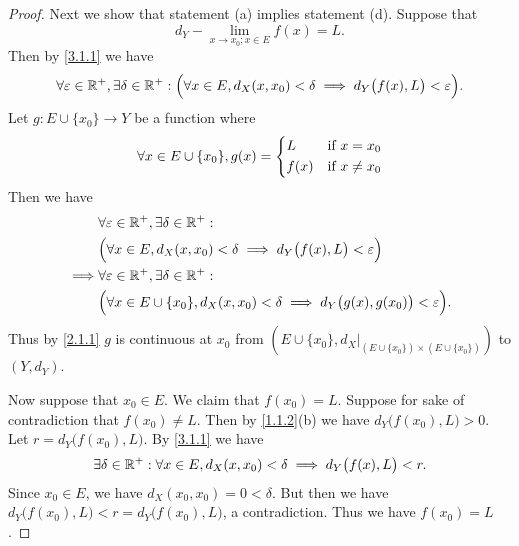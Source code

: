 \begin{proof}
  Next we show that statement (a) implies statement (d).
  Suppose that
  \[
    d_Y - \lim_{x \to x_0 ; x \in E} f(x) = L.
  \]
  Then by \cref{3.1.1} we have
  \[
    \forall \varepsilon \in \mathbb{R}^+, \exists \delta \in \mathbb{R}^+ : \Big(\forall x \in E, d_X(x, x_0) < \delta \implies d_Y\big(f(x), L\big) < \varepsilon\Big).
  \]
  Let \(g : E \cup \{x_0\} \to Y\) be a function where
  \[
    \forall x \in E \cup \{x_0\}, g(x) = \begin{dcases}
      L    & \text{if } x = x_0    \\
      f(x) & \text{if } x \neq x_0
    \end{dcases}
  \]
  Then we have
  \begin{align*}
             & \forall \varepsilon \in \mathbb{R}^+, \exists \delta \in \mathbb{R}^+ :                                                        \\
             & \Big(\forall x \in E, d_X(x, x_0) < \delta \implies d_Y\big(f(x), L\big) < \varepsilon\Big)                    \\
    \implies & \forall \varepsilon \in \mathbb{R}^+, \exists \delta \in \mathbb{R}^+ :                                                        \\
             & \Big(\forall x \in E \cup \{x_0\}, d_X(x, x_0) < \delta \implies d_Y\big(g(x), g(x_0)\big) < \varepsilon\Big).
  \end{align*}
  Thus by \cref{2.1.1} \(g\) is continuous at \(x_0\) from \((E \cup \{x_0\}, d_X|_{(E \cup \{x_0\}) \times (E \cup \{x_0\})})\) to \((Y, d_Y)\).

  Now suppose that \(x_0 \in E\).
  We claim that \(f(x_0) = L\).
  Suppose for sake of contradiction that \(f(x_0) \neq L\).
  Then by \cref{1.1.2}(b) we have \(d_Y\big(f(x_0), L\big) > 0\).
  Let \(r = d_Y\big(f(x_0), L\big)\).
  By \cref{3.1.1} we have
  \[
    \exists \delta \in \mathbb{R}^+ : \forall x \in E, d_X(x, x_0) < \delta \implies d_Y\big(f(x), L\big) < r.
  \]
  Since \(x_0 \in E\), we have \(d_X(x_0, x_0) = 0 < \delta\).
  But then we have \(d_Y\big(f(x_0), L\big) < r = d_Y\big(f(x_0), L\big)\), a contradiction.
  Thus we have \(f(x_0) = L\).


\end{proof}

